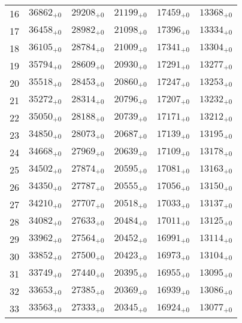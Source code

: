 \documentclass[10pt, a4paper]{article}
\begin{document}
\begin{center}
\begin{longtable}{c || c c c c c}
        \hline
        16 & \({36862}_{+0}\) & \({29208}_{+0}\) & \({21199}_{+0}\) & \({17459}_{+0}\) & \({13368}_{+0}\)\\
        17 & \({36458}_{+0}\) & \({28982}_{+0}\) & \({21098}_{+0}\) & \({17396}_{+0}\) & \({13334}_{+0}\)\\
        18 & \({36105}_{+0}\) & \({28784}_{+0}\) & \({21009}_{+0}\) & \({17341}_{+0}\) & \({13304}_{+0}\)\\
        19 & \({35794}_{+0}\) & \({28609}_{+0}\) & \({20930}_{+0}\) & \({17291}_{+0}\) & \({13277}_{+0}\)\\
        20 & \({35518}_{+0}\) & \({28453}_{+0}\) & \({20860}_{+0}\) & \({17247}_{+0}\) & \({13253}_{+0}\)\\
        \hline
        21 & \({35272}_{+0}\) & \({28314}_{+0}\) & \({20796}_{+0}\) & \({17207}_{+0}\) & \({13232}_{+0}\)\\
        22 & \({35050}_{+0}\) & \({28188}_{+0}\) & \({20739}_{+0}\) & \({17171}_{+0}\) & \({13212}_{+0}\)\\
        23 & \({34850}_{+0}\) & \({28073}_{+0}\) & \({20687}_{+0}\) & \({17139}_{+0}\) & \({13195}_{+0}\)\\
        24 & \({34668}_{+0}\) & \({27969}_{+0}\) & \({20639}_{+0}\) & \({17109}_{+0}\) & \({13178}_{+0}\)\\
        25 & \({34502}_{+0}\) & \({27874}_{+0}\) & \({20595}_{+0}\) & \({17081}_{+0}\) & \({13163}_{+0}\)\\
        \hline
        26 & \({34350}_{+0}\) & \({27787}_{+0}\) & \({20555}_{+0}\) & \({17056}_{+0}\) & \({13150}_{+0}\)\\
        27 & \({34210}_{+0}\) & \({27707}_{+0}\) & \({20518}_{+0}\) & \({17033}_{+0}\) & \({13137}_{+0}\)\\
        28 & \({34082}_{+0}\) & \({27633}_{+0}\) & \({20484}_{+0}\) & \({17011}_{+0}\) & \({13125}_{+0}\)\\
        29 & \({33962}_{+0}\) & \({27564}_{+0}\) & \({20452}_{+0}\) & \({16991}_{+0}\) & \({13114}_{+0}\)\\
        30 & \({33852}_{+0}\) & \({27500}_{+0}\) & \({20423}_{+0}\) & \({16973}_{+0}\) & \({13104}_{+0}\)\\
        \hline
        31 & \({33749}_{+0}\) & \({27440}_{+0}\) & \({20395}_{+0}\) & \({16955}_{+0}\) & \({13095}_{+0}\)\\
        32 & \({33653}_{+0}\) & \({27385}_{+0}\) & \({20369}_{+0}\) & \({16939}_{+0}\) & \({13086}_{+0}\)\\
        33 & \({33563}_{+0}\) & \({27333}_{+0}\) & \({20345}_{+0}\) & \({16924}_{+0}\) & \({13077}_{+0}\)\\

\end{longtable}
\end{center}
\end{document}

